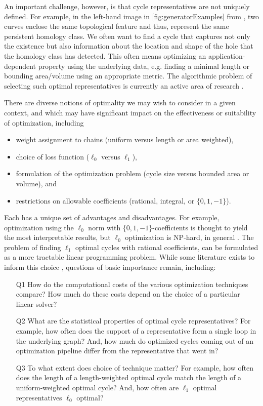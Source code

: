 An important challenge, however, is that cycle representatives are not uniquely defined. For example, in the left-hand image in \fig \ref{fig:generatorExamples} from \cite{Carlsson2009TopologyAD}, two curves enclose the same topological feature and thus, represent the same persistent homology class. We often want to find a cycle that captures not only the existence but also information about the location and shape of the hole that the homology class has detected. This often means optimizing an application-dependent property using the underlying data, e.g. finding a minimal length or bounding area/volume using an appropriate metric. The algorithmic problem of selecting such optimal representatives is currently an active area of research \cite{dey2011optimal,dey2018,Obayashi2018,wu,chen2010measuring}. 

There are diverse notions of optimality we may wish to consider in a given context, and which may have significant impact on the effectiveness or suitability of  optimization, including  
\begin{itemize}
    \item weight assignment to chains (uniform versus length or area weighted), 
 \item choice of loss function ($\ell_0$ versus $\ell_1$), 
 \item formulation of the optimization problem (cycle size versus bounded area or volume), and \item restrictions on allowable coefficients (rational, integral, or $\{0,1,-1\}$).  
 \end{itemize}
 Each has a unique set of advantages and disadvantages. For example, optimization using the $\ell_0$ norm with $\{0, 1, -1\}$-coefficients is thought to yield the most interpretable results, but $\ell_0$ optimization is NP-hard, in general \cite{chenhardness}. 
The problem of finding $\ell_1$ optimal cycles with rational coefficients, can be formulated as a more tractable linear programming problem.
While some literature exists to inform this choice \cite{dey2011optimal,Escolar2016,Obayashi2018}, questions of basic importance remain, including: 

\begin{enumerate}
  \item[Q1] How do the computational costs of the various optimization techniques compare? How much do these costs depend on the choice of a particular linear solver? 
  \item[Q2] What are the statistical properties of optimal cycle representatives? For example,  how often does the support of a representative form a single loop in the underlying graph? And,  how much do optimized cycles coming out of an optimization pipeline differ from the representative that went in?     
    \item[Q3] To what extent does choice of technique matter? For example, how often does the length of a length-weighted optimal cycle match the length of a uniform-weighted optimal cycle? 
    And, how often are $\ell_1$ optimal representatives $\ell_0$ optimal? 
\end{enumerate}

